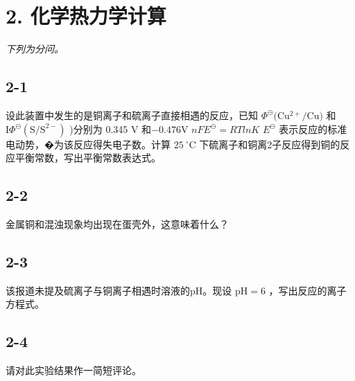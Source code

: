 \section*{2. 化学热力学计算}
\textit{下列为分问。}

\subsection*{2-1}
设此装置中发⽣的是铜离⼦和硫离⼦直接相遇的反应，已知 $\Phi ^ { \ominus } ( \mathrm { C u ^ { 2 + } / C u ) }$ 和 ${ \mathrm { I } } \Phi ^ { \ominus } ( { \mathrm { S } } / { \mathrm { S } } ^ { 2 - } )$ )分别为 0.345 V 和$- 0 . 4 7 6 \mathrm { V }$ $n F E ^ { \ominus } = R T l n K$ $E ^ { \ominus }$ 表⽰反应的标准电动势，�为该反应得失电⼦数。计算 $2 5 ~ ^ { \circ } \mathrm { C }$ 下硫离⼦和铜离2⼦反应得到铜的反应平衡常数，写出平衡常数表达式。

\subsection*{2-2}
⾦属铜和混浊现象均出现在蛋壳外，这意味着什么？

\subsection*{2-3}
该报道未提及硫离⼦与铜离⼦相遇时溶液的pH。现设 $\mathrm { p H } = 6$ ，写出反应的离⼦⽅程式。

\subsection*{2-4}
请对此实验结果作⼀简短评论。
